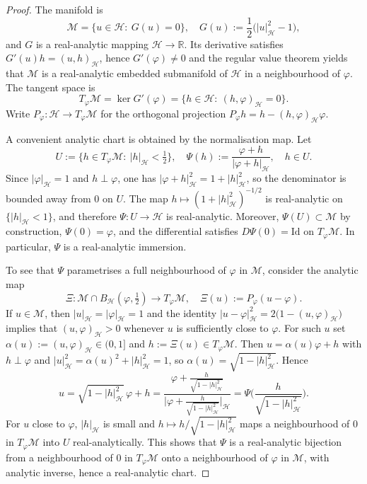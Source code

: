 \documentclass[10pt,a4paper]{amsart}
\numberwithin{equation}{section}
\begin{document}
\begin{proof}
The manifold is
\[
\mathcal M=\{u\in \mathcal H:\ G(u)=0\},\quad G(u)
:=\frac12\bigl(|u|_{\mathcal H}^{2}-1\bigr),
\]
and $G$ is a real-analytic mapping $\mathcal H\to\mathbb R$. Its derivative satisfies
$G'(u)h=(u,h)_{\mathcal H}$, hence $G'(\varphi)\neq 0$ and the regular value theorem
yields that
$\mathcal M$ is a real-analytic embedded submanifold of $\mathcal H$ in a
neighbourhood of
$\varphi$. The tangent space is
\[
T_\varphi\mathcal M=\ker G'(\varphi)=\{h\in\mathcal H:\ (h,\varphi)_{\mathcal H}=0\}.
\]
Write $P_\varphi:\mathcal H\to T_\varphi\mathcal M$ for the orthogonal projection
$P_\varphi h=h-(h,\varphi)_{\mathcal H}\varphi$.

A convenient analytic chart is obtained by the normalisation map. Let
\[
U:=\{h\in T_\varphi\mathcal M:\ |h|_{\mathcal H}<\tfrac12\},
\quad
\Psi(h):=\frac{\varphi+h}{|\varphi+h|_{\mathcal H}},\quad h\in U.
\]
Since $|\varphi|_{\mathcal H}=1$ and $h\perp \varphi$, one has
$|\varphi+h|_{\mathcal H}^{2}=1+|h|_{\mathcal H}^{2}$, so the denominator is bounded
away from
$0$ on $U$. The map $h\mapsto (1+|h|_{\mathcal H}^{2})^{-1/2}$ is real-analytic on
$\{|h|_{\mathcal H}<1\}$, and therefore $\Psi:U\to\mathcal H$ is real-analytic.
Moreover,
$\Psi(U)\subset\mathcal M$ by construction, $\Psi(0)=\varphi$, and the differential
satisfies
$D\Psi(0)=\mathrm{Id}$ on $T_\varphi\mathcal M$. In particular, $\Psi$ is a
real-analytic immersion.

To see that $\Psi$ parametrises a full neighbourhood of $\varphi$ in $\mathcal M$,
consider the analytic map
\[
\Xi:\mathcal M\cap B_{\mathcal H}(\varphi,\tfrac12)\to T_\varphi\mathcal M,
\quad
\Xi(u):=P_\varphi(u-\varphi).
\]
If $u\in\mathcal M$, then $|u|_{\mathcal H}=|\varphi|_{\mathcal H}=1$ and the identity
$|u-\varphi|_{\mathcal H}^{2}=2\bigl(1-(u,\varphi)_{\mathcal H}\bigr)$ implies that
$(u,\varphi)_{\mathcal H}>0$ whenever $u$ is sufficiently close to $\varphi$. For such $u$ set
$\alpha(u):=(u,\varphi)_{\mathcal H}\in(0,1]$ and $h:=\Xi(u)\in T_\varphi\mathcal M$.
Then
$u=\alpha(u)\varphi+h$ with $h\perp\varphi$ and
$|u|_{\mathcal H}^{2}=\alpha(u)^{2}+|h|_{\mathcal H}^{2}=1$,
so $\alpha(u)=\sqrt{1-|h|_{\mathcal H}^{2}}$. Hence
\[
u=\sqrt{1-|h|_{\mathcal H}^{2}}\,\varphi+h
=\frac{\varphi+\frac{h}{\sqrt{1-|h|_{\mathcal H}^{2}}}}
{\big|\varphi+\frac{h}{\sqrt{1-|h|_{\mathcal H}^{2}}}\big|_{\mathcal H}}
=\Psi\Big(\frac{h}{\sqrt{1-|h|_{\mathcal H}^{2}}}\Big).
\]
For $u$ close to $\varphi$, $|h|_{\mathcal H}$ is small and
$h\mapsto h/\sqrt{1-|h|_{\mathcal H}^{2}}$ maps a neighbourhood of $0$ in
$T_\varphi\mathcal M$
into $U$ real-analytically. This shows that $\Psi$ is a real-analytic bijection from a
neighbourhood of $0$ in $T_\varphi\mathcal M$ onto a neighbourhood of $\varphi$
in $\mathcal M$,
with analytic inverse, hence a real-analytic chart.


\end{proof}
\end{document}

